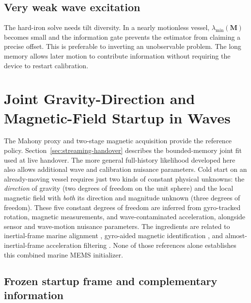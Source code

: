 \documentclass[conference]{IEEEtran}
\DeclareRobustCommand{\mat}[1]{\bm{#1}}
\begin{document}
\subsection{Very weak wave excitation}

The hard-iron solve needs tilt diversity.  In a nearly motionless vessel,
$\lambda_{\min}(\mat M)$ becomes small and the information gate prevents the estimator
from claiming a precise offset.  This is preferable to inverting an unobservable
problem.  The long memory allows later motion to contribute information without
requiring the device to restart calibration.


\section{Joint Gravity-Direction and Magnetic-Field Startup in Waves}
\label{sec:joint-startup-proposal}

The Mahony proxy and two-stage magnetic acquisition provide the reference
policy. Section~\ref{sec:streaming-handover} describes the bounded-memory
joint fit used at live handover. The more general full-history likelihood
developed here also allows additional wave and calibration nuisance parameters.  Cold
start on an already-moving vessel requires just two kinds of constant
physical unknowns: the \emph{direction} of gravity (two degrees of
freedom on the unit sphere) and the local magnetic field with \emph{both}
its direction and magnitude unknown (three degrees of freedom).
These five constant degrees of freedom are inferred from gyro-tracked
rotation, magnetic measurements, and wave-contaminated acceleration,
alongside sensor and wave-motion nuisance parameters.  The ingredients are related to inertial-frame marine
alignment \cite{Zhao2016MarineAlignment}, gyro-aided magnetic identification
\cite{Wu2018DynamicMagCalibration}, and almost-inertial-frame acceleration
filtering \cite{Laidig2023VQF}.  None of those references alone establishes
this combined marine MEMS initializer.

\subsection{Frozen startup frame and complementary information}
\end{document}

